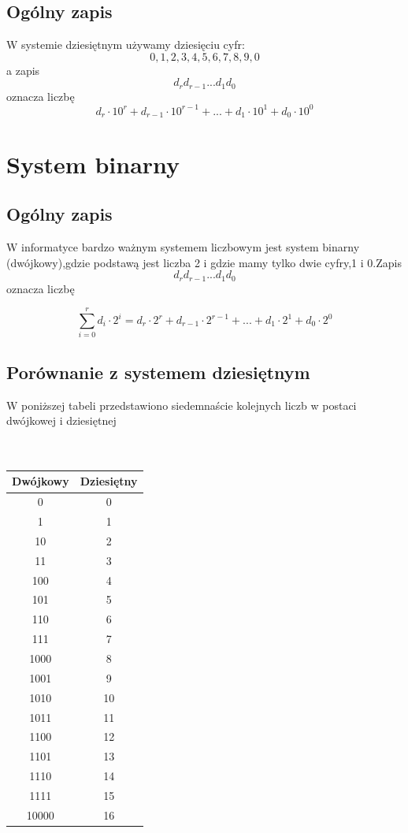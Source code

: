 \documentclass[12pt]{article}
\begin{document}
\subsection{Ogólny zapis}
 W systemie dziesiętnym używamy dziesięciu cyfr: $$0,1,2,3,4,5,6,7,8,9,0$$ a zapis $$d_rd_{r-1}...d_1d_0$$oznacza liczbę$$d_r\cdot10^r+d_{r-1}\cdot10^{r-1}+...+d_1\cdot10^1+d_0\cdot10^0$$

\newpage
\section{System binarny}
\subsection{Ogólny zapis}
W informatyce bardzo ważnym systemem liczbowym jest system binarny (dwójkowy),gdzie podstawą jest liczba 2 i gdzie mamy tylko dwie cyfry,1 i 0.Zapis$$d_rd_{r-1}...d_1d_0$$oznacza liczbę

$$\sum_{i=0}^{r} d_i\cdot2^i=d_r\cdot2^r+d_{r-1}\cdot2^{r-1}+...+d_1\cdot2^1+d_0\cdot2^0$$
\subsection{Porównanie z systemem dziesiętnym}
W poniższej tabeli przedstawiono siedemnaście kolejnych liczb w postaci dwójkowej i dziesiętnej
\\
\\
\\

{\centering
\begin{tabular}{|c|c|}
\hline
Dwójkowy&Dziesiętny\\ \hline
0&0\\
1&1\\
10&2\\
11&3\\
100&4\\
101&5\\
110&6\\
111&7\\
1000&8\\
1001&9\\
1010&10\\
1011&11\\
1100&12\\
1101&13\\
1110&14\\
1111&15\\
10000&16\\
\hline
\end{tabular}
\\}
\end{document}
